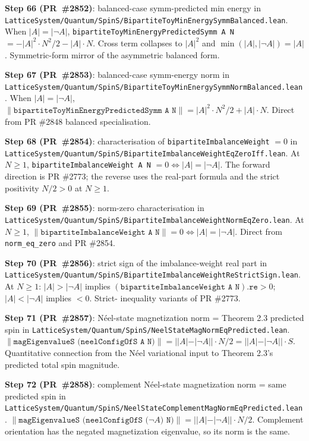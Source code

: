 \documentclass[a4paper,11pt]{article}
\begin{document}
\textbf{Step 66 (PR~\#2852)}: balanced-case symm-predicted min
energy in
\texttt{LatticeSystem/Quantum/SpinS/BipartiteToyMinEnergySymmBalanced.lean}.
When $|A| = |\neg A|$,
\texttt{bipartiteToyMinEnergyPredictedSymm A N} $= -|A|^2 \cdot
N^2 / 2 - |A| \cdot N$. Cross term collapses to $|A|^2$ and
$\min(|A|, |\neg A|) = |A|$. Symmetric-form mirror of the
asymmetric balanced form.

\textbf{Step 67 (PR~\#2853)}: balanced-case symm-energy norm in
\texttt{LatticeSystem/Quantum/SpinS/BipartiteToyMinEnergySymmNormBalanced.lean}.
When $|A| = |\neg A|$,
$\|\texttt{bipartiteToyMinEnergyPredictedSymm A N}\| = |A|^2 \cdot
N^2 / 2 + |A| \cdot N$. Direct from PR \#2848 balanced
specialisation.

\textbf{Step 68 (PR~\#2854)}: characterisation of
\texttt{bipartiteImbalanceWeight} $= 0$ in
\texttt{LatticeSystem/Quantum/SpinS/BipartiteImbalanceWeightEqZeroIff.lean}.
At $N \ge 1$, \texttt{bipartiteImbalanceWeight A N} $= 0
\Leftrightarrow |A| = |\neg A|$. The forward direction is PR
\#2773; the reverse uses the real-part formula and the strict
positivity $N / 2 > 0$ at $N \ge 1$.

\textbf{Step 69 (PR~\#2855)}: norm-zero characterisation in
\texttt{LatticeSystem/Quantum/SpinS/BipartiteImbalanceWeightNormEqZero.lean}.
At $N \ge 1$, $\|\texttt{bipartiteImbalanceWeight A N}\| = 0
\Leftrightarrow |A| = |\neg A|$. Direct from \texttt{norm\_eq\_zero}
and PR \#2854.

\textbf{Step 70 (PR~\#2856)}: strict sign of the imbalance-weight
real part in
\texttt{LatticeSystem/Quantum/SpinS/BipartiteImbalanceWeightReStrictSign.lean}.
At $N \ge 1$: $|A| > |\neg A|$ implies $(\texttt{bipartiteImbalanceWeight
A N}).\texttt{re} > 0$; $|A| < |\neg A|$ implies $< 0$. Strict-
inequality variants of PR \#2773.

\textbf{Step 71 (PR~\#2857)}: Néel-state magnetization norm =
Theorem 2.3 predicted spin in
\texttt{LatticeSystem/Quantum/SpinS/NeelStateMagNormEqPredicted.lean}.
$\|\texttt{magEigenvalueS (neelConfigOfS A N)}\| = ||A| - |\neg A||
\cdot N / 2 = ||A| - |\neg A|| \cdot S$. Quantitative connection
from the Néel variational input to Theorem 2.3's predicted total
spin magnitude.

\textbf{Step 72 (PR~\#2858)}: complement Néel-state magnetization
norm = same predicted spin in
\texttt{LatticeSystem/Quantum/SpinS/NeelStateComplementMagNormEqPredicted.lean}.
$\|\texttt{magEigenvalueS (neelConfigOfS (}\neg A\texttt{) N)}\| =
||A| - |\neg A|| \cdot N / 2$. Complement orientation has the
negated magnetization eigenvalue, so its norm is the same.
\end{document}
